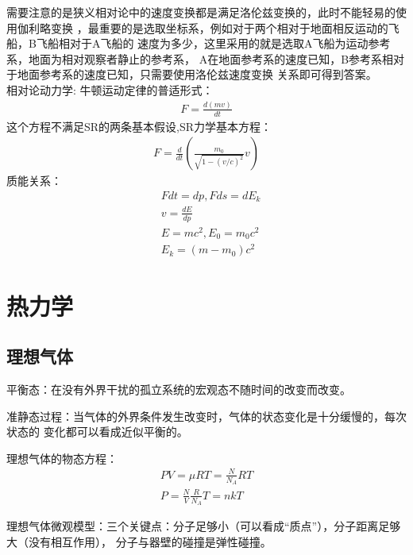 \documentclass[UTF8]{article}
\numberwithin{equation}{section}
\begin{document}
需要注意的是狭义相对论中的速度变换都是满足洛伦兹变换的，此时不能轻易的使用伽利略变换
，最重要的是选取坐标系，例如对于两个相对于地面相反运动的飞船，B飞船相对于A飞船的
速度为多少，这里采用的就是选取A飞船为运动参考系，地面为相对观察者静止的参考系，
A在地面参考系的速度已知，B参考系相对于地面参考系的速度已知，只需要使用洛伦兹速度变换
关系即可得到答案。\\
相对论动力学:
牛顿运动定律的普适形式：
\begin{align*}
    F=\frac{d(mv)}{dt}
\end{align*}
这个方程不满足SR的两条基本假设,SR力学基本方程：
\begin{align*}
    F=\frac{d}{dt}(\frac{m_0}{\sqrt{1-(v/c)^2}}v)
\end{align*}
质能关系：
\begin{align*}
    &Fdt=dp,Fds=dE_k\\
    &v=\frac{dE}{dp}\\
    &E=mc^2,E_0=m_0c^2\\
    &E_k=(m-m_0)c^2
\end{align*}
\section{热力学}
\subsection{理想气体}
平衡态：在没有外界干扰的孤立系统的宏观态不随时间的改变而改变。

准静态过程：当气体的外界条件发生改变时，气体的状态变化是十分缓慢的，每次状态的
变化都可以看成近似平衡的。

理想气体的物态方程：
\begin{align*}
    PV=\mu RT=\frac{N}{N_A}RT\\
    P=\frac{N}{V}\frac{R}{N_A}T=nkT
\end{align*}

理想气体微观模型：三个关键点：分子足够小（可以看成“质点”），分子距离足够大（没有相互作用），
分子与器壁的碰撞是弹性碰撞。
\end{document}
